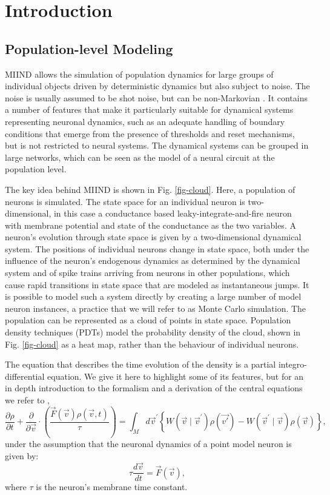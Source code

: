 \documentclass[utf8]{frontiersSCNS} %
\begin{document}
\section{Introduction}

\subsection{Population-level Modeling}
MIIND allows the simulation of population dynamics
for large groups of individual objects driven by deterministic dynamics but also subject to noise. The noise is usually assumed to be shot noise, but can be non-Markovian \citep{lai2017population}. 
It contains a number of features that make it particularly suitable for dynamical systems representing neuronal dynamics, such as an adequate handling of boundary conditions that emerge from the presence of thresholds and reset mechanisms, but is not restricted to neural systems. The dynamical systems can be grouped in large networks, which can be seen as the model of a neural circuit at the population level.

The key idea behind MIIND is shown in Fig. \ref{fig-cloud}. Here, a population of neurons is simulated. The state space for an individual neuron is two-dimensional, in this case a conductance based leaky-integrate-and-fire neuron with membrane potential and state of the conductance as the two variables. A neuron's evolution through state space is given by a two-dimensional dynamical system. The positions of individual neurons change in state space, both under the influence of the neuron's endogenous dynamics as determined by the dynamical system and of spike trains arriving from neurons in other populations, which cause rapid transitions in state space that are modeled as instantaneous jumps. It is possible to model such a system directly by creating a large number of model neuron instances, a practice that we will refer to as Monte Carlo simulation. The population can be represented as a cloud of points in state space. Population density techniques (PDTs) model the probability density of the cloud, shown in Fig. \ref{fig-cloud} as a heat map, rather than the behaviour of individual neurons. 

The equation that describes the time evolution of the density is a partial integro-differential equation. We give it here to highlight some of its features, but for an in depth introduction to the formalism and a derivation of the central equations we refer to \cite{omurtag2000},
\begin{equation}                                        
  \frac{ \partial \rho }{ \partial t } + \frac{\partial}{ \partial \vec{v}} \cdot ( \frac{\vec{F}(\vec{v}) \rho(\vec{v},t)}{\tau} ) = \int_{M} d \vec{v}^{\prime} \left\{ W(\vec{v} \mid \vec{v}^{\prime})\rho(\vec{v'}) - W(\vec{v}^{\prime} \mid \vec{v}  )\rho(\vec{v}) \right\},
\label{eq-balance}                                          
\end{equation}  
under the assumption that the neuronal dynamics of a point model neuron is given by:
\begin{equation}
\tau \frac{ d \vec{v}}{dt} = \vec{F}(\vec{v}), 
\end{equation}
where $\tau$ is the neuron's membrane time constant.
\end{document}
